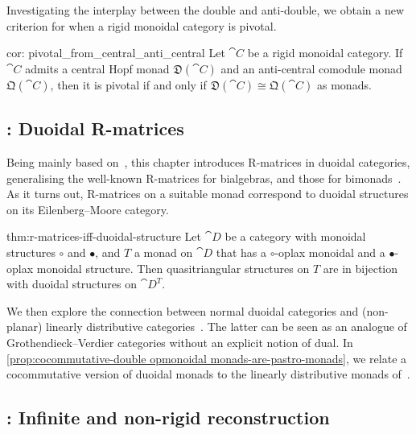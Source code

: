 Investigating the interplay between the double and anti\hyp{}double,
we obtain a new criterion for when a rigid monoidal category is pivotal.

\begin{reptheorem}{cor: pivotal_from_central_anti_central}
  Let \(\cat{C}\) be a rigid monoidal category.
  If \(\cat{C}\) admits a central Hopf monad \(\mathfrak{D}(\cat{C})\)
  and an anti\hyp{}central comodule monad \(\mathfrak{Q}(\cat{C})\),
  then it is pivotal if and only if \(\mathfrak{D}(\cat{C}) \cong \mathfrak{Q}(\cat{C})\) as monads.
\end{reptheorem}

\subsection*{: Duoidal R-matrices}

Being mainly based on~\cite{zorman25:duoid-r-matric},
this chapter introduces R\hyp{}matrices in duoidal categories,
generalising the well\hyp{}known R\hyp{}matrices for bialgebras,
and those for bimonads~\cite{Bruguieres2007}.
As it turns out, R-matrices on a suitable monad correspond to duoidal structures on its Eilenberg–Moore category.

\begin{reptheorem}{thm:r-matrices-iff-duoidal-structure}
  Let \(\cat{D}\) be a category with monoidal structures \(\circ\) and \(\bullet\),
  and \(T\) a monad on \(\cat{D}\) that has a \(\circ\)\hyp{}oplax monoidal and a \(\bullet\)\hyp{}oplax monoidal structure.
  Then quasi\-triangular structures on \(T\) are in bijection with duoidal structures on \(\cat{D}^T\).
\end{reptheorem}

We then explore the connection between normal duoidal categories
and (non-planar) linearly distributive categories~\cite{cockett97:weakl,garner16:commut}.
The latter can be seen as an analogue of Grothendieck–Verdier categories without an explicit notion of dual.
In \cref{prop:cocommutative-double opmonoidal monads-are-pastro-monads},
we relate a cocommutative version of duoidal monads
to the linearly distributive monads of~\cite{pastro12:note}.

\subsection*{: Infinite and non-rigid reconstruction}

